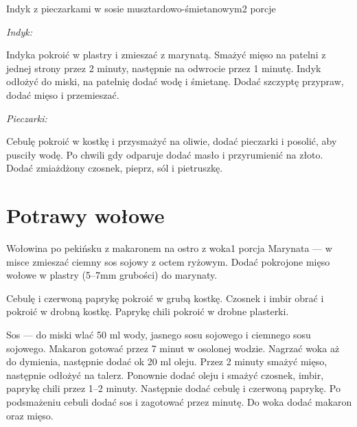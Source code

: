 \documentclass[a4paper,12pt]{article}
\begin{document}
\begin{recipe}{Indyk z pieczarkami w sosie musztardowo-śmietanowym}{2 porcje}{}

\freeform%
\begin{center}
\textit{Indyk:}
\end{center}
Indyka pokroić w plastry i zmieszać z marynatą. 
Smażyć mięso na patelni z jednej strony przez 2 minuty, następnie na odwrocie
przez 1 minutę. Indyk odłożyć do miski, na patelnię dodać wodę i śmietanę.
Dodać szczyptę przypraw, dodać mięso i przemieszać. 

\freeform%
\begin{center}
\textit{Pieczarki:}
\end{center}


Cebulę pokroić w kostkę i przysmażyć na oliwie, dodać pieczarki i posolić, aby
pusciły wodę. Po chwili gdy odparuje dodać masło i przyrumienić na złoto. Dodać
zmiażdżony czosnek, pieprz, sól i pietruszkę.

\end{recipe}

\newpage

\section{Potrawy wołowe}

\begin{recipe}{Wołowina po pekińsku z makaronem na ostro z woka}{1 porcja}{}
Marynata --- w misce zmieszać ciemny sos sojowy z octem ryżowym. Dodać
pokrojone mięso wołowe w plastry (5--7mm grubości) do marynaty.

Cebulę i czerwoną paprykę pokroić w grubą kostkę. Czosnek i imbir obrać i
pokroić w drobną kostkę. Paprykę chili pokroić w drobne plasterki.

Sos --- do miski wlać 50 ml wody, jasnego sosu sojowego i ciemnego sosu sojowego. 
Makaron gotować przez 7 minut w osolonej wodzie.
\freeform%
Nagrzać woka aż do dymienia, następnie dodać ok 20 ml oleju. Przez 2 minuty
smażyć mięso, następnie odłożyć na talerz. Ponownie dodać oleju i smażyć
czosnek, imbir, paprykę chili przez 1--2 minuty. Następnie dodać cebulę i
czerwoną paprykę. Po podsmażeniu cebuli dodać sos i zagotować przez minutę. Do
woka dodać makaron oraz mięso.

\end{recipe}
\end{document}
